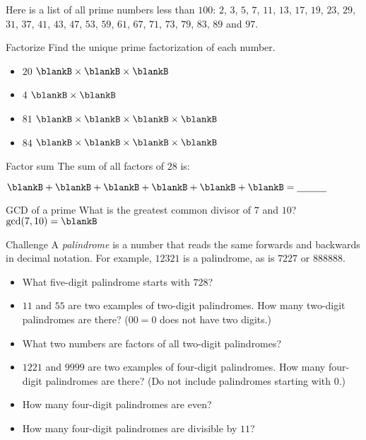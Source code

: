 \documentclass[12pt,letterpaper]{article}
\begin{document}
\pagebreak

Here is a list of all prime numbers less than $100$: $2$, $3$, $5$, $7$, $11$, $13$,
$17$, $19$, $23$, $29$, $31$, $37$, $41$, $43$, $47$, $53$, $59$, $61$, $67$,
$71$, $73$, $79$, $83$, $89$ and $97$.

\begin{problem}{Factorize}
 Find the unique prime factorization of each number.

 \begin{itemize}
  \item $20$ \hfill $\blankB \times \blankB \times \blankB$
  \item $4$ \hfill $\blankB \times \blankB$
  \item $81$ \hfill $\blankB \times \blankB \times \blankB \times \blankB$
  \item $84$ \hfill $\blankB \times \blankB \times \blankB \times \blankB$
 \end{itemize}
\end{problem}

\begin{problem}{Factor sum}
 The sum of all factors of $28$ is:

 $\blankB +
 \blankB +
 \blankB +
 \blankB +
 \blankB +
 \blankB = \underline{\hspace{3em}}$
\end{problem}

\begin{problem}{GCD of a prime}
 What is the greatest common divisor of $7$ and $10$? \hfill
 $\gcd(7, 10) = \blankB$
\end{problem}

\begin{problem}{Challenge}
 A \emph{palindrome} is a number that reads the same forwards and backwards in
 decimal notation. For example, $12321$ is a palindrome, as is $7227$ or
 $888888$.

 \begin{itemize}
  \item What five-digit palindrome starts with $728$? \underline{\hspace{5em}}
  \item $11$ and $55$ are two examples of two-digit palindromes.
  How many two-digit palindromes are there? ($00=0$ does not have two digits.)
  \item What two numbers are factors of all two-digit palindromes?
  \item $1221$ and $9999$ are two examples of four-digit palindromes. How many
  four-digit palindromes are there? (Do not include palindromes starting with
  $0$.)
  \item How many four-digit palindromes are even?
  \item How many four-digit palindromes are divisible by $11$?
 \end{itemize}
\end{problem}
\end{document}
